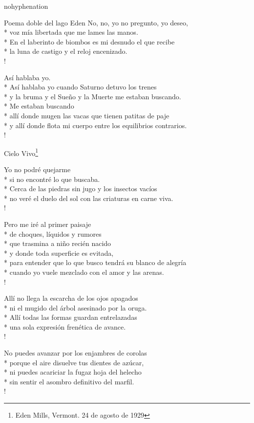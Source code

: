 \documentclass[
    a5paper,
    DIV=10,
    12pt,
    notitlepage,
    oneside,]
{scrbook} %
\begin{document}
\begin{hyphenrules}{nohyphenation}
\begin{poem}{Poema doble del lago Eden}{}{\vspace{-1em}}
No, no, yo no pregunto, yo deseo,\\*
voz mía libertada que me lames las manos.\\*
En el laberinto de biombos es mi desnudo el que recibe\\*
la luna de castigo y el reloj encenizado.\\!

Así hablaba yo.\\*
Así hablaba yo cuando Saturno detuvo los trenes\\*
y la bruma y el Sueño y la Muerte me estaban buscando.\\*
Me estaban buscando\\*
allí donde mugen las vacas que tienen patitas de paje\\*
y allí donde flota mi cuerpo entre los equilibrios contrarios.\\!

\end{poem}

\begin{poem}{Cielo Vivo}{\footnote{Eden Mills, Vermont. 24 de agosto de 1929}}{\vspace{-1em}}

Yo no podré quejarme\\*
si no encontré lo que buscaba.\\*
Cerca de las piedras sin jugo y los insectos vacíos\\*
no veré el duelo del sol con las criaturas en carne viva.\\!

Pero me iré al primer paisaje\\*
de choques, líquidos y rumores\\*
que trasmina a niño recién nacido\\*
y donde toda superficie es evitada,\\*
para entender que lo que busco tendrá su blanco de alegría\\*
cuando yo vuele mezclado con el amor y las arenas.\\!

Allí no llega la escarcha de los ojos apagados\\*
ni el mugido del árbol asesinado por la oruga.\\*
Allí todas las formas guardan entrelazadas\\*
una sola expresión frenética de avance.\\!

No puedes avanzar por los enjambres de corolas\\*
porque el aire disuelve tus dientes de azúcar,\\*
ni puedes acariciar la fugaz hoja del helecho\\*
sin sentir el asombro definitivo del marfil.\\!


\end{poem}
\end{hyphenrules}
\end{document}
